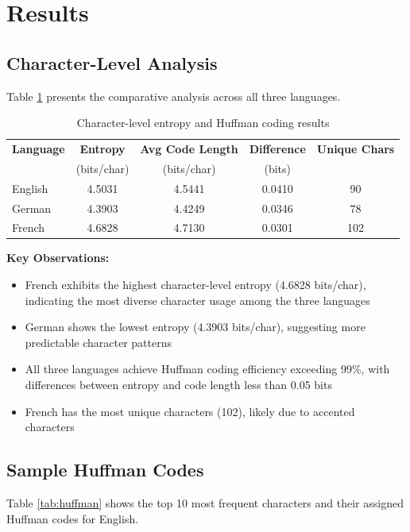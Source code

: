 \documentclass[11pt]{article}
\begin{document}
\section{Results}

\subsection{Character-Level Analysis}
Table \ref{tab:char_level} presents the comparative analysis across all three languages.

\begin{table}[h]
\centering
\begin{tabular}{lcccc}
\hline
\textbf{Language} & \textbf{Entropy} & \textbf{Avg Code Length} & \textbf{Difference} & \textbf{Unique Chars} \\
                  & (bits/char)      & (bits/char)              & (bits)              &                       \\
\hline
English           & 4.5031           & 4.5441                   & 0.0410              & 90                    \\
German            & 4.3903           & 4.4249                   & 0.0346              & 78                    \\
French            & 4.6828           & 4.7130                   & 0.0301              & 102                   \\
\hline
\end{tabular}
\caption{Character-level entropy and Huffman coding results}
\label{tab:char_level}
\end{table}

\textbf{Key Observations:}
\begin{itemize}
    \item French exhibits the highest character-level entropy (4.6828 bits/char), indicating the most diverse character usage among the three languages
    \item German shows the lowest entropy (4.3903 bits/char), suggesting more predictable character patterns
    \item All three languages achieve Huffman coding efficiency exceeding 99\%, with differences between entropy and code length less than 0.05 bits
    \item French has the most unique characters (102), likely due to accented characters
\end{itemize}

\subsection{Sample Huffman Codes}
Table \ref{tab:huffman} shows the top 10 most frequent characters and their assigned Huffman codes for English.
\end{document}
